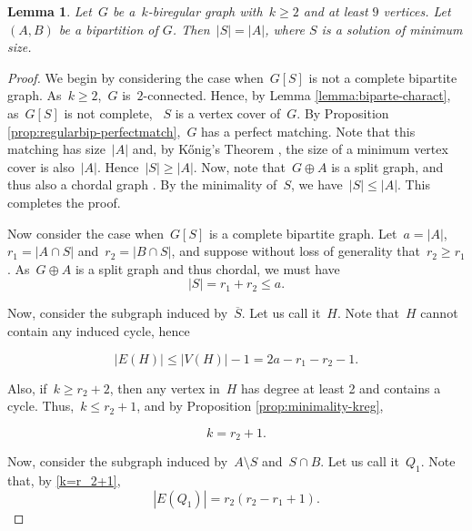 \documentclass[11pt]{article}
\newtheorem{lemma}[theorem]{Lemma}
\theoremstyle{definition}
\begin{document}
\begin{lemma}\label{lemma:bipkreg}
Let~$G$ be a~$k$-biregular graph with~$k\geq 2$ and at least $9$ vertices.
Let $(A,B)$ be a bipartition of $G$. Then~$|S|=|A|$, where $S$ is a solution of minimum size.
\end{lemma}
\begin{proof}

 We begin by considering the case when~$G[S]$ is not a complete bipartite graph.
As~$k\geq 2$,~$G$ is~$2$-connected. Hence, by Lemma \ref{lemma:biparte-charact}, as~$G[S]$ is not complete,   ~$S$ is a vertex cover of~$G$. By Proposition \ref{prop:regularbip-perfectmatch},~$G$ has a perfect matching. Note that this matching has size~$|A|$ and, by Kőnig's Theorem \cite{Konig1916}, the size of a minimum vertex cover is also~$|A|$. Hence~$|S| \geq |A|$. Now, note that~$G \oplus A$ is a split graph, and thus also a chordal graph \cite{Golumbic1980}.
    By the minimality of~$S$, we have~$|S| \leq |A|$. This completes the proof.    


Now consider the case when~$G[S]$ is a complete bipartite graph.
Let~$a=|A|$,~$r_1 = |A \cap S|$ and~$r_2 = |B \cap S|$,
and suppose without loss of generality that~$r_2 \geq r_1$.
As~$G \oplus A$ is a split graph and thus chordal,
we must have 
\begin{equation}\label{r_1+r_2leqa}
  |S|= r_1+r_2 \leq a.  
\end{equation}


Now, consider the subgraph induced by~$\overline{S}$.
Let us call it~$H$.
Note that~$H$ cannot contain any induced cycle, hence

\begin{equation}\label{EHleq2a-r_1-r_2-1}
|E(H)| \leq |V(H)|-1 = 2a-r_1-r_2-1.
\end{equation}

Also, if~$k\geq r_2+2$, then any vertex in~$H$ has degree at least 2 and contains a cycle.
Thus,~$k \leq r_2+1$, and by Proposition \ref{prop:minimality-kreg},

\begin{equation}\label{k=r_2+1}
k=r_2+1.
\end{equation}

Now, consider the subgraph induced by~$A\setminus S$ and~$S \cap B$.
Let us call it~$Q_1$.
Note that, by \eqref{k=r_2+1},
\begin{equation}\label{EQ1=r_2(r_2-r_1+1)}
|E(Q_1)| = r_2(r_2-r_1+1).
\end{equation}


\end{proof}
\end{document}
